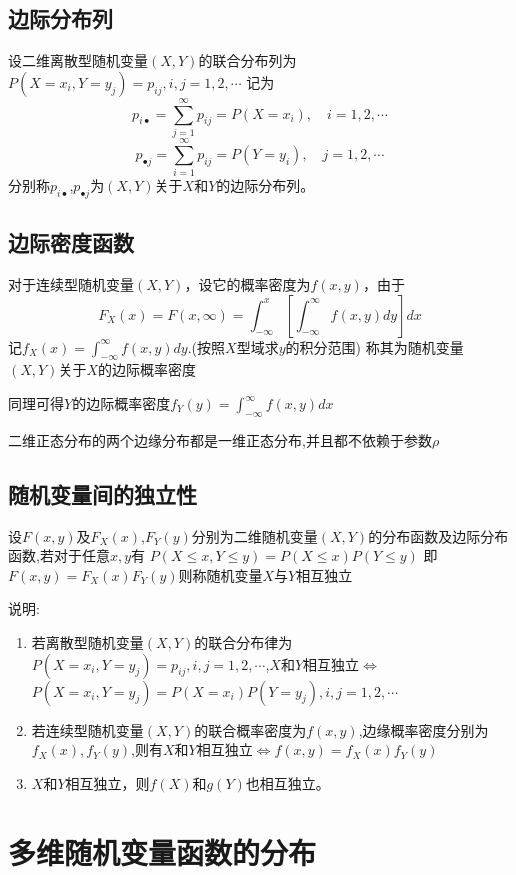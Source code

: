 \subsection{边际分布列}
设二维离散型随机变量$(X,Y)$的联合分布列为$P(X=x_i,Y=y_j)=p_{ij},i,j=1,2,\cdots$
记为
$${p_{i \bullet }} = \sum\limits_{j = 1}^\infty  {{p_{ij}}}  = P(X = {x_i}) ,\quad i = 1,2, \cdots$$
$${p_{ \bullet j}} = \sum\limits_{i = 1}^\infty  {{p_{ij}}}  = P(Y = {y_i}) ,\quad j = 1,2, \cdots$$
分别称$p_{i \bullet }$,$p_{ \bullet j}$为$(X,Y)$关于$X \text{和} Y$的边际分布列。

\subsection{边际密度函数}
对于连续型随机变量$(X,Y)$，设它的概率密度为$f(x,y)$，由于
$${F_X}(x) = F(x,\infty ) = \int_{ - \infty }^x {[\int_{ - \infty }^\infty  {f(x,y)dy} ]} dx$$
记${f_X}(x) = \int_{ - \infty }^\infty  {f(x,y)dy} $.(按照$X$型域求$y$的积分范围)
称其为随机变量$(X,Y)$关于$X$的边际概率密度

同理可得$Y$的边际概率密度${f_Y}(y) = \int_{ - \infty }^{ \infty } {f(x,y)dx} $

二维正态分布的两个边缘分布都是一维正态分布,并且都不依赖于参数$\rho$

\subsection{随机变量间的独立性}
设$F(x,y)$及$F_X(x)$,$F_Y(y)$分别为二维随机变量$(X,Y)$的分布函数及边际分布函数,若对于任意$x,y$有
$P(X \leqslant x,Y \leqslant y)=P(X \leqslant x)P(Y \leqslant y)$
即$F(x,y)=F_X(x)F_Y(y)$则称随机变量$X$与$Y$相互独立

说明:
\begin{enumerate}
    \item 若离散型随机变量$(X,Y)$的联合分布律为$P(X=x_i,Y=y_j)=p_{ij},i,j=1,2,\cdots$,$X$和$Y$相互独立$\Leftrightarrow$$P(X=x_i,Y=y_j)=P(X=x_i)P(Y=y_j),i,j=1,2,\cdots$

    \item 若连续型随机变量$(X,Y)$的联合概率密度为$f(x,y)$,边缘概率密度分别为$f_X(x),f_Y(y)$,则有$X$和$Y$相互独立$\Leftrightarrow$$f(x,y)=f_X(x)f_Y(y)$

    \item $X$和$Y$相互独立，则$f(X)$和$g(Y)$也相互独立。
\end{enumerate}

\section{多维随机变量函数的分布}
